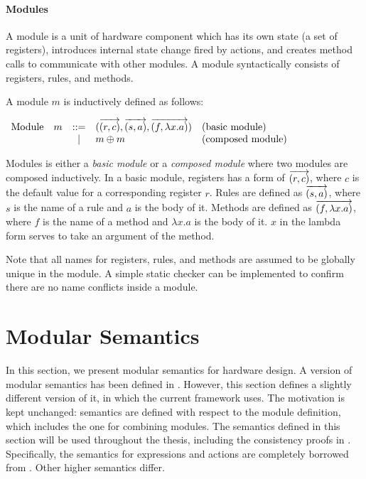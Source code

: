 \paragraph{Modules}
A module is a unit of hardware component which has its own state (a
set of registers), introduces internal state change fired by actions,
and creates method calls to communicate with other modules. A module
syntactically consists of registers, rules, and methods.

\begin{definition}
  \label{def-module}
  A module $m$ is inductively defined as follows:
  \begin{center}
    \begin{math}
      \begin{array}{rcll}
        \textrm{Module}\quad m & ::=
        & (\overrightarrow{(r, c)}, \overrightarrow{(s, a)}, \overrightarrow{(f, \lambda x.a)})
        & \textrm{(basic module)} \\
        & | & m \oplus m & \textrm{(composed module)}
      \end{array}
    \end{math}
  \end{center}
\end{definition}

Modules is either a \emph{basic module} or a \emph{composed module}
where two modules are composed inductively. In a basic module,
registers has a form of $\overrightarrow{(r, c)}$, where $c$ is the
default value for a corresponding register $r$. Rules are defined as
$\overrightarrow{(s, a)}$, where $s$ is the name of a rule and $a$ is
the body of it. Methods are defined as $\overrightarrow{(f, \lambda
    x.a)}$, where $f$ is the name of a method and $\lambda x.a$ is the
body of it. $x$ in the lambda form serves to take an argument of the
method.

Note that all names for registers, rules, and methods are assumed to
be globally unique in the module. A simple static checker can be
implemented to confirm there are no name conflicts inside a module.

\section{Modular Semantics}
\label{sec-semmod}

In this section, we present modular semantics for hardware design. A
version of modular semantics has been defined in \cite{murali-thesis}.
However, this section defines a slightly different version of it, in
which the current \Kami{} framework uses. The motivation is kept
unchanged: semantics are defined with respect to the module
definition, which includes the one for combining modules. The
semantics defined in this section will be used throughout the thesis,
including the consistency proofs in \todo{} . Specifically, the
semantics for expressions and actions are completely borrowed from
\cite{murali-thesis}. Other higher semantics differ.

